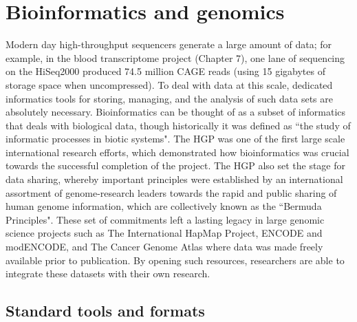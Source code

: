 \section{Bioinformatics and genomics}

Modern day high-throughput sequencers generate a large amount of data; for example, in the blood transcriptome project (Chapter 7), one lane of sequencing on the HiSeq2000 produced 74.5 million CAGE reads (using 15 gigabytes of storage space when uncompressed). To deal with data at this scale, dedicated informatics tools for storing, managing, and the analysis of such data sets are absolutely necessary. Bioinformatics can be thought of as a subset of informatics that deals with biological data, though historically it was defined as ``the study of informatic processes in biotic systems"\cite{pmid21483479}. The HGP was one of the first large scale international research efforts, which demonstrated how bioinformatics was crucial towards the successful completion of the project\cite{stein1996perl}. The HGP also set the stage for data sharing, whereby important principles were established by an international assortment of genome-research leaders towards the rapid and public sharing of human genome information, which are collectively known as the ``Bermuda Principles". These set of commitments left a lasting legacy in large genomic science projects such as The International HapMap Project, ENCODE and modENCODE, and The Cancer Genome Atlas where data was made freely available prior to publication\cite{contreras2011bermuda}. By opening such resources, researchers are able to integrate these datasets with their own research.

\subsection{Standard tools and formats}

